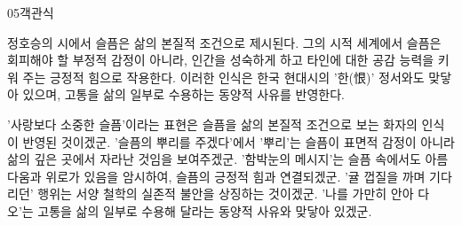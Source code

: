 \documentclass[fs85,seriesWit]{korfarm-base}
\begin{document}
\begin{kfQBlock}{05}{객관식}
\begin{kfEvidence}정호승의 시에서 슬픔은 삶의 본질적 조건으로 제시된다. 그의 시적 세계에서 슬픔은 회피해야 할 부정적 감정이 아니라, 인간을 성숙하게 하고 타인에 대한 공감 능력을 키워 주는 긍정적 힘으로 작용한다. 이러한 인식은 한국 현대시의 '한(恨)' 정서와도 맞닿아 있으며, 고통을 삶의 일부로 수용하는 동양적 사유를 반영한다.\end{kfEvidence}
\begin{kfChoices}
\kfChoice '사랑보다 소중한 슬픔'이라는 표현은 슬픔을 삶의 본질적 조건으로 보는 화자의 인식이 반영된 것이겠군.
\kfChoice '슬픔의 뿌리를 주겠다'에서 '뿌리'는 슬픔이 표면적 감정이 아니라 삶의 깊은 곳에서 자라난 것임을 보여주겠군.
\kfChoice '함박눈의 메시지'는 슬픔 속에서도 아름다움과 위로가 있음을 암시하여, 슬픔의 긍정적 힘과 연결되겠군.
\kfChoice '귤 껍질을 까며 기다리던' 행위는 서양 철학의 실존적 불안을 상징하는 것이겠군.
\kfChoice '나를 가만히 안아 다오'는 고통을 삶의 일부로 수용해 달라는 동양적 사유와 맞닿아 있겠군.
\end{kfChoices}
\end{kfQBlock}

\kfEndMC
\end{document}
